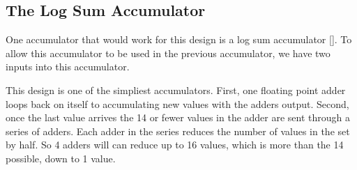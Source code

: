 \subsection{The Log Sum Accumulator}
One accumulator that would work for this design is a log sum accumulator [\cite{prelim:sun1}]. To allow this accumulator to be used in the previous accumulator, we have two inputs into this accumulator.

This design is one of the simpliest accumulators. First, one floating point adder loops back on itself to accumulating new values with the adders output. Second, once the last value arrives the 14 or fewer values in the adder are sent through a series of adders. Each adder in the series reduces the number of values in the set by half. So 4 adders will can reduce up to 16 values, which is more than the 14 possible, down to 1 value.

